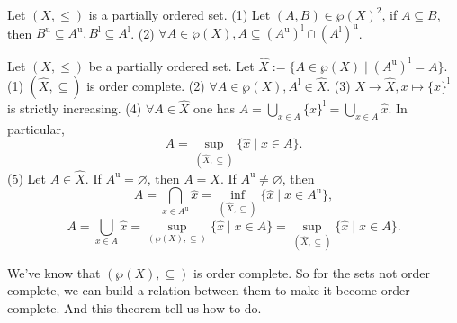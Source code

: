 \begin{lemmaenv}
    Let $(X, \le)$ is a partially ordered set.
    \newline
    (1) Let $(A, B)\in \wp(X)^2$,  if $A\subseteq B$,  then $B^\mathrm{u}\subseteq A^\mathrm{u}, B^\mathrm{l}\subseteq A^\mathrm{l}$.
    \newline
    (2) $\forall A\in \wp(X), A\subseteq (A^\mathrm{u})^\mathrm{l}\cap (A^\mathrm{l})^\mathrm{u}$.
\end{lemmaenv}

\begin{theoremenv}
    \quad
    \newline
    Let $(X, \le )$ be a partially ordered set. Let $\hat{X}:=\{A\in \wp (X)\mid (A^\mathrm{u})^\mathrm{l}=A\}$.
\newline
(1) $(\hat{X}, \subseteq)$ is order complete.
\newline
(2) $\forall A\in \wp(X), A^\mathrm{l}\in \hat{X}$.
\newline
(3) $X\rightarrow \hat{X}, x\mapsto \{x\}^\mathrm{l}$ is strictly increasing.
\newline
(4) $\forall A\in \hat{X}$ one has $A=\bigcup_{x\in A}\{x\}^\mathrm{l}=\bigcup_{x\in A}\hat{x}$. In particular,  
$$A=\sup_{(\hat{X}, \subseteq)}\{\hat{x}\mid x\in A\}.$$
(5) Let $A\in \hat{X}$. If $A^\mathrm{u}=\varnothing$,  then $A=X$. If $A^\mathrm{u}\not=\varnothing$, then 
$$A=\bigcap_{x\in A^\mathrm{u}}\hat{x}=\inf_{(\hat{X}, \subseteq)}\{\hat{x}\mid x\in A^\mathrm{u}\}, $$
$$A=\bigcup_{x\in A}\hat{x}=\sup_{(\wp(X), \subseteq)}\{\hat{x}\mid x\in A\}=\sup_{(\hat{X}, \subseteq)}\{\hat{x}\mid x \in A\}.$$
\end{theoremenv}
\begin{remark}
    We've know that $(\wp(X), \subseteq)$ is order complete. So for the sets not order complete,  we can build a relation between them to make it become order complete. And this theorem tell us how to do.
\end{remark}
